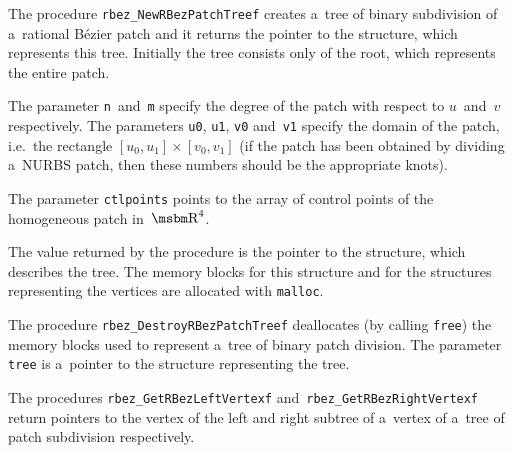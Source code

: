 \vspace{\bigskipamount}
The procedure \texttt{rbez\_NewRBezPatchTreef} creates a~tree of binary subdivision
of a~rational B\'{e}zier patch and it returns the pointer to the structure,
which represents this tree. Initially the tree consists only of the root,
which represents the entire patch.

The parameter \texttt{n}~and~\texttt{m} specify the degree of the patch
with respect to $u$~and~$v$ respectively. The parameters \texttt{u0},
\texttt{u1}, \texttt{v0} and~\texttt{v1} specify the domain of the patch,
i.e.\ the rectangle $[u_0,u_1]\times[v_0,v_1]$ (if the patch has been
obtained by dividing a~NURBS patch, then these numbers should be
the appropriate knots).

The parameter \texttt{ctlpoints} points to the array of control points
of the homogeneous patch in~$\R^4$.

The value returned by the procedure is the pointer to the structure,
which describes the tree. The memory blocks for this structure and
for the structures representing the vertices are allocated with
\texttt{malloc}.

\vspace{\bigskipamount}
The procedure \texttt{rbez\_DestroyRBezPatchTreef} deallocates (by calling
\texttt{free}) the memory blocks used to represent a~tree of binary
patch division. The parameter \texttt{tree} is a~pointer to the structure
representing the tree.

\vspace{\bigskipamount}
The procedures \texttt{rbez\_GetRBezLeftVertexf}
and~\texttt{rbez\_GetRBezRightVertexf}
return pointers to the vertex of the left and right subtree of a~vertex of a~tree
of patch subdivision respectively.

